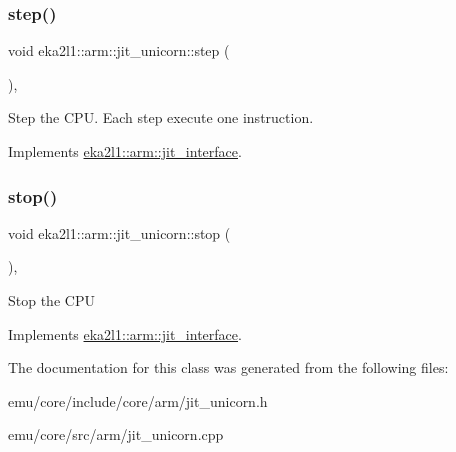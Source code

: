 \mbox{\label{classeka2l1_1_1arm_1_1jit__unicorn_a48ef5b1901b82dae466c340785997c92}} 
\subsubsection{\texorpdfstring{step()}{step()}}
{\footnotesize\ttfamily void eka2l1\+::arm\+::jit\+\_\+unicorn\+::step (\begin{DoxyParamCaption}{ }\end{DoxyParamCaption})\hspace{0.3cm}{\ttfamily [override]}, {\ttfamily [virtual]}}

Step the C\+PU. Each step execute one instruction. 

Implements \mbox{\hyperlink{classeka2l1_1_1arm_1_1jit__interface_a424b0596eba2527407be4669d432f9b5}{eka2l1\+::arm\+::jit\+\_\+interface}}.

\mbox{\label{classeka2l1_1_1arm_1_1jit__unicorn_ab3ca860b367d833950226b0d7f95edc5}} 
\subsubsection{\texorpdfstring{stop()}{stop()}}
{\footnotesize\ttfamily void eka2l1\+::arm\+::jit\+\_\+unicorn\+::stop (\begin{DoxyParamCaption}{ }\end{DoxyParamCaption})\hspace{0.3cm}{\ttfamily [override]}, {\ttfamily [virtual]}}

Stop the C\+PU 

Implements \mbox{\hyperlink{classeka2l1_1_1arm_1_1jit__interface_a8454089a0370df8830884c07bc972755}{eka2l1\+::arm\+::jit\+\_\+interface}}.



The documentation for this class was generated from the following files\+:\begin{DoxyCompactItemize}
\item 
emu/core/include/core/arm/jit\+\_\+unicorn.\+h\item 
emu/core/src/arm/jit\+\_\+unicorn.\+cpp\end{DoxyCompactItemize}
